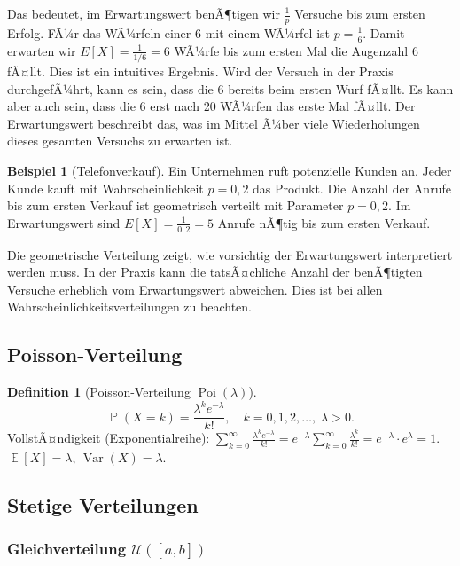 ﻿\documentclass[12pt,a4paper]{article}
\theoremstyle{definition}
\newtheorem{definition}{Definition}[section]
\newtheorem{beispiel}{Beispiel}[section]
\theoremstyle{plain}
\theoremstyle{remark}
\DeclareMathOperator{\E}{\mathbb{E}}
\DeclareMathOperator{\Var}{Var}
\DeclareMathOperator{\Prob}{\mathbb{P}}
\begin{document}
Das bedeutet, im Erwartungswert benÃ¶tigen wir $\frac{1}{p}$ Versuche bis zum
ersten Erfolg. FÃ¼r das WÃ¼rfeln einer $6$ mit einem WÃ¼rfel ist
$p = \frac{1}{6}$. Damit erwarten wir $E[X] = \frac{1}{1/6} = 6$ WÃ¼rfe bis
zum ersten Mal die Augenzahl $6$ fÃ¤llt. Dies ist ein intuitives Ergebnis.
Wird der Versuch in der Praxis durchgefÃ¼hrt, kann es sein, dass die $6$
bereits beim ersten Wurf fÃ¤llt. Es kann aber auch sein, dass die $6$ erst
nach 20 WÃ¼rfen das erste Mal fÃ¤llt. Der Erwartungswert beschreibt das, was
im Mittel Ã¼ber viele Wiederholungen dieses gesamten Versuchs zu erwarten ist.

\begin{beispiel}[Telefonverkauf]\label{bsp:telefonverkauf}
  Ein Unternehmen ruft potenzielle Kunden an. Jeder Kunde kauft mit
  Wahrscheinlichkeit $p = 0{,}2$ das Produkt. Die Anzahl der Anrufe bis zum
  ersten Verkauf ist geometrisch verteilt mit Parameter $p = 0{,}2$. Im
  Erwartungswert sind $E[X] = \frac{1}{0{,}2} = 5$ Anrufe nÃ¶tig bis zum
  ersten Verkauf.
\end{beispiel}

Die geometrische Verteilung zeigt, wie vorsichtig der Erwartungswert
interpretiert werden muss. In der Praxis kann die tatsÃ¤chliche Anzahl der
benÃ¶tigten Versuche erheblich vom Erwartungswert abweichen. Dies ist bei allen
Wahrscheinlichkeitsverteilungen zu beachten.

\subsection{Poisson-Verteilung}

\begin{definition}[Poisson-Verteilung $\operatorname{Poi}(\lambda)$]\label{def:poisson}
  \[
    \Prob(X=k) = \frac{\lambda^k e^{-\lambda}}{k!}, \quad k=0,1,2,\ldots,\;
    \lambda > 0.
  \]
  VollstÃ¤ndigkeit (Exponentialreihe):
  $\sum_{k=0}^{\infty}\frac{\lambda^k e^{-\lambda}}{k!}
   = e^{-\lambda} \sum_{k=0}^{\infty}\frac{\lambda^k}{k!}
   = e^{-\lambda} \cdot e^{\lambda} = 1$. \\
  $\E[X] = \lambda$, $\Var(X) = \lambda$.
\end{definition}

\subsection{Stetige Verteilungen}

\subsubsection{Gleichverteilung $\mathcal{U}([a,b])$}
\end{document}
